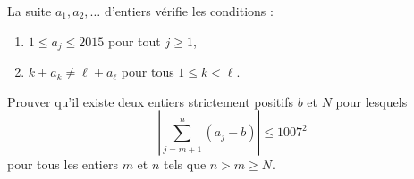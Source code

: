 La suite $a_1, a_2, \ldots$ d'entiers vérifie les conditions :
\begin{enumerate}
  \item[(i)] $1 \leqslant a_j \leqslant 2015$ pour tout $j \geqslant 1$,
  \item[(ii)] $k + a_k \neq \ell + a_\ell$ pour tous $1 \leqslant k < \ell$.
\end{enumerate}
Prouver qu'il existe deux entiers strictement positifs $b$ et $N$ pour lesquels
\[
\left|\sum_{j=m+1}^{n} (a_j - b)\right| \leqslant 1007^2
\]
pour tous les entiers $m$ et $n$ tels que $n > m \geqslant N$.
